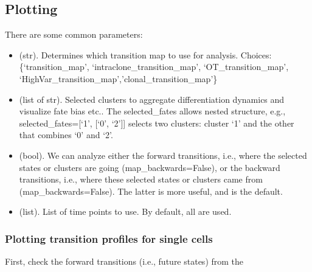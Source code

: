 \documentclass[letterpaper,10pt,english]{sphinxmanual}
\begin{document}
\subsection{Plotting}
\label{\detokenize{20210121_cospar_tutorial:Plotting}}
There are some common parameters:
\begin{itemize}
\item {} 
 (str). Determines which transition map to use for analysis. Choices: \{‘transition\_map’, ‘intraclone\_transition\_map’, ‘OT\_transition\_map’, ‘HighVar\_transition\_map’,’clonal\_transition\_map’\}

\item {} 
 (list of str). Selected clusters to aggregate differentiation dynamics and visualize fate bias etc.. The selected\_fates allows nested structure, e.g., selected\_fates={[}‘1’, {[}‘0’, ‘2’{]}{]} selects two clusters: cluster ‘1’ and the other that combines ‘0’ and ‘2’.

\item {} 
 (bool). We can analyze either the forward transitions, i.e., where the selected states or clusters are going (map\_backwards=False), or the backward transitions, i.e., where these selected states or clusters came from (map\_backwards=False). The latter is more useful, and is the default.

\item {} 
 (list). List of time points to use. By default, all are used.

\end{itemize}


\subsubsection{Plotting transition profiles for single cells}
\label{\detokenize{20210121_cospar_tutorial:Plotting-transition-profiles-for-single-cells}}
First, check the forward transitions (i.e., future states) from the 
\end{document}
